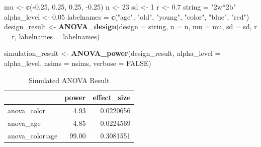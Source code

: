 \documentclass[]{book}
\newenvironment{Shaded}{\begin{snugshade}}{\end{snugshade}}
\newcommand{\DataTypeTok}[1]{\textcolor[rgb]{0.13,0.29,0.53}{#1}}
\newcommand{\DecValTok}[1]{\textcolor[rgb]{0.00,0.00,0.81}{#1}}
\newcommand{\FloatTok}[1]{\textcolor[rgb]{0.00,0.00,0.81}{#1}}
\newcommand{\KeywordTok}[1]{\textcolor[rgb]{0.13,0.29,0.53}{\textbf{#1}}}
\newcommand{\NormalTok}[1]{#1}
\newcommand{\OperatorTok}[1]{\textcolor[rgb]{0.81,0.36,0.00}{\textbf{#1}}}
\newcommand{\OtherTok}[1]{\textcolor[rgb]{0.56,0.35,0.01}{#1}}
\newcommand{\StringTok}[1]{\textcolor[rgb]{0.31,0.60,0.02}{#1}}
\begin{document}
\begin{Shaded}
\begin{Highlighting}[]
\NormalTok{mu <-}\StringTok{ }\KeywordTok{c}\NormalTok{(}\OperatorTok{-}\FloatTok{0.25}\NormalTok{, }\FloatTok{0.25}\NormalTok{, }\FloatTok{0.25}\NormalTok{, }\FloatTok{-0.25}\NormalTok{)}
\NormalTok{n <-}\StringTok{ }\DecValTok{23}
\NormalTok{sd <-}\StringTok{ }\DecValTok{1}
\NormalTok{r <-}\StringTok{ }\FloatTok{0.7}
\NormalTok{string =}\StringTok{ "2w*2b"}
\NormalTok{alpha_level <-}\StringTok{ }\FloatTok{0.05}
\NormalTok{labelnames =}\StringTok{ }\KeywordTok{c}\NormalTok{(}\StringTok{"age"}\NormalTok{, }\StringTok{"old"}\NormalTok{, }\StringTok{"young"}\NormalTok{, }\StringTok{"color"}\NormalTok{, }\StringTok{"blue"}\NormalTok{, }\StringTok{"red"}\NormalTok{)}
\NormalTok{design_result <-}\StringTok{ }\KeywordTok{ANOVA_design}\NormalTok{(}\DataTypeTok{design =}\NormalTok{ string,}
                              \DataTypeTok{n =}\NormalTok{ n, }
                              \DataTypeTok{mu =}\NormalTok{ mu, }
                              \DataTypeTok{sd =}\NormalTok{ sd, }
                              \DataTypeTok{r =}\NormalTok{ r, }
                              \DataTypeTok{labelnames =}\NormalTok{ labelnames)}
\end{Highlighting}
\end{Shaded}

\begin{Shaded}
\begin{Highlighting}[]
\NormalTok{simulation_result <-}\StringTok{ }\KeywordTok{ANOVA_power}\NormalTok{(design_result, }
                                 \DataTypeTok{alpha_level =}\NormalTok{ alpha_level, }
                                 \DataTypeTok{nsims =}\NormalTok{ nsims,}
                                 \DataTypeTok{verbose =} \OtherTok{FALSE}\NormalTok{)}
\end{Highlighting}
\end{Shaded}

\begin{table}[!h]

\caption{\label{tab:unnamed-chunk-177}Simulated ANOVA Result}
\centering
\begin{tabular}{l|r|r}
\hline
  & power & effect\_size\\
\hline
anova\_color & 4.93 & 0.0220656\\
\hline
anova\_age & 4.85 & 0.0224569\\
\hline
anova\_color:age & 99.00 & 0.3081551\\
\hline
\end{tabular}
\end{table}
\end{document}
